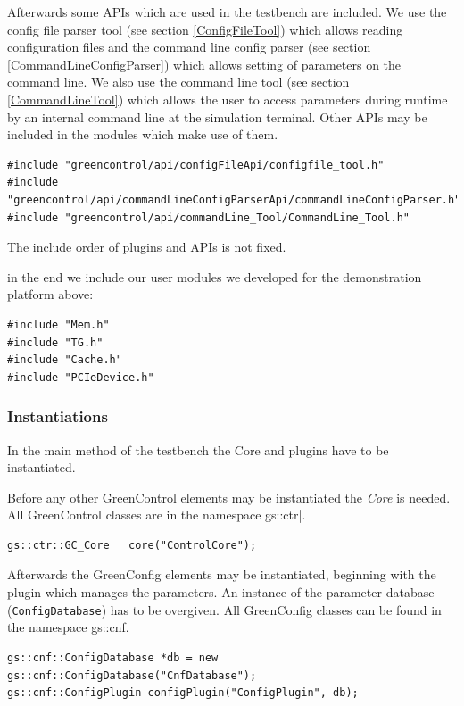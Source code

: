 Afterwards some APIs which are used in the testbench are included. We use the config file parser tool (see section \ref{ConfigFileTool}) which allows reading configuration files and the command line config parser (see section \ref{CommandLineConfigParser}) which allows setting of parameters on the command line. We also use the command line tool (see section \ref{CommandLineTool}) which allows the user to access parameters during runtime by an internal command line at the simulation terminal. Other APIs may be included in the modules which make use of them.
\begin{lstlisting}
#include "greencontrol/api/configFileApi/configfile_tool.h"
#include "greencontrol/api/commandLineConfigParserApi/commandLineConfigParser.h"
#include "greencontrol/api/commandLine_Tool/CommandLine_Tool.h"
\end{lstlisting}

The include order of plugins and APIs is not fixed.

in the end we include our user modules we developed for the demonstration platform above:
\begin{lstlisting}
#include "Mem.h"
#include "TG.h"
#include "Cache.h"
#include "PCIeDevice.h"
\end{lstlisting}

\subsubsection{Instantiations}
\label{Instantiations}

In the main method of the testbench the Core and plugins have to be instantiated.

Before any other GreenControl elements may be instantiated the \emph{Core} is needed. All GreenControl classes are in the namespace {\sffamily gs::ctr}|.
\begin{lstlisting}
gs::ctr::GC_Core   core("ControlCore");
\end{lstlisting}

Afterwards the GreenConfig elements may be instantiated, beginning with the plugin which manages the parameters. An instance of the parameter database (\lstinline|ConfigDatabase|) has to be overgiven. All GreenConfig classes can be found in the namespace {\sffamily gs::cnf}.
\begin{lstlisting}
gs::cnf::ConfigDatabase *db = new gs::cnf::ConfigDatabase("CnfDatabase");
gs::cnf::ConfigPlugin configPlugin("ConfigPlugin", db);
\end{lstlisting}

